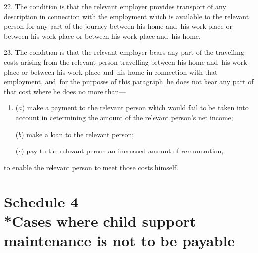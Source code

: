 \documentclass[12pt,a4paper]{article}
\begin{document}
22.  The condition is that the relevant employer provides transport of any description in connection with the employment which is available to the relevant person for any part of the journey between his home and~his work place or between his work place or between his work place and~his home.

\medskip

23.  The condition is that the relevant employer bears any part of the travelling costs arising from the relevant person travelling between his home and~his work place or between his work place and~his home in connection with that employment, and~for the purposes of this paragraph~he does not bear any part of that cost where he does no more than—
\begin{enumerate}\item[]
($a$) make a payment to the relevant person which would fail to be taken into account in determining the amount of the relevant person’s net income;

($b$) make a loan to the relevant person;

($c$) pay to the relevant person an increased amount of remuneration,
\end{enumerate}
to enable the relevant person to meet those costs himself.

\part[Schedule 4 --- Cases where child support maintenance is not to be payable]{Schedule 4\\*Cases where child support maintenance is not to be payable}

\renewcommand\parthead{--- Schedule 4}
\end{document}
